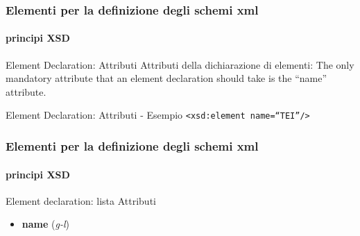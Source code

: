 \begin{frame}
	\frametitle{Elementi per la definizione degli schemi xml}
	\framesubtitle{principi XSD}
	\addtocounter{nframe}{1}

	\begin{block}{Element Declaration: Attributi}
		Attributi della dichiarazione di elementi: The only mandatory attribute that an element declaration should take is the ``name'' attribute.
	\end{block}

	\begin{block}{Element Declaration: Attributi - Esempio}
		\texttt{<xsd:element name=``TEI''/> }
	\end{block}

\end{frame}

\begin{frame}
	\frametitle{Elementi per la definizione degli schemi xml}
	\framesubtitle{principi XSD}
	\addtocounter{nframe}{1}

	\begin{block}{Element declaration: lista Attributi}
		\begin{itemize}
			\item \textbf{name} (\textit{g-l})
		\end{itemize}


	\end{block}

\end{frame}



